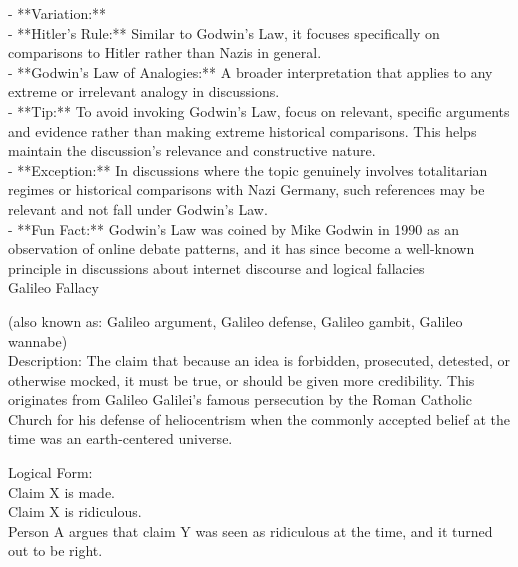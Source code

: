 \documentclass[a4paper,12pt,single,pdftex]{scrartcl}
\begin{document}
    
      - **Variation:**
    \\

    
        - **Hitler's Rule:** Similar to Godwin's Law, it focuses specifically on comparisons to Hitler rather than Nazis in general.
    \\

    
        - **Godwin’s Law of Analogies:** A broader interpretation that applies to any extreme or irrelevant analogy in discussions.
    \\

    
      - **Tip:** To avoid invoking Godwin's Law, focus on relevant, specific arguments and evidence rather than making extreme historical comparisons. This helps maintain the discussion's relevance and constructive nature.
    \\

    
      - **Exception:** In discussions where the topic genuinely involves totalitarian regimes or historical comparisons with Nazi Germany, such references may be relevant and not fall under Godwin's Law.
    \\

    
      - **Fun Fact:** Godwin's Law was coined by Mike Godwin in 1990 as an observation of online debate patterns, and it has since become a well-known principle in discussions about internet discourse and logical fallacies
    \\

  

Galileo Fallacy
    
      (also known as: Galileo argument, Galileo defense, Galileo gambit, Galileo wannabe)
    \\

  
    Description: The claim that because an idea is forbidden, prosecuted, detested, or otherwise mocked, it must be true, or should be given more credibility. This originates from Galileo Galilei's famous persecution by the Roman Catholic Church for his defense of heliocentrism when the commonly accepted belief at the time was an earth-centered universe.

    
      Logical Form:
    \\

    
      Claim X is made.
    \\

    
      Claim X is ridiculous.
    \\

    
      Person A argues that claim Y was seen as ridiculous at the time, and it turned out to be right.
    \\
\end{document}

